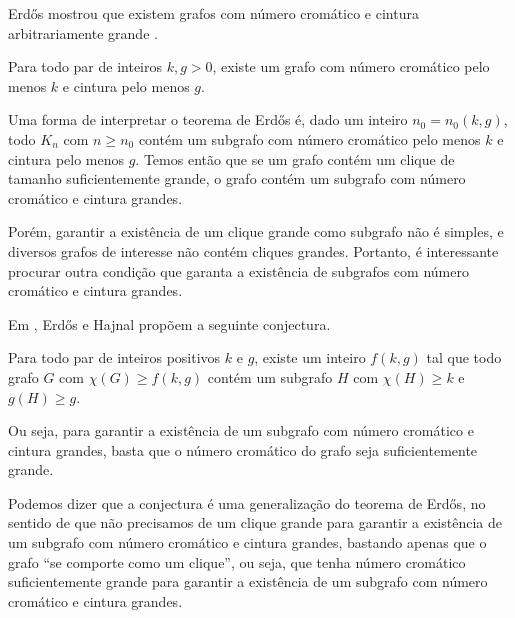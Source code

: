 
Erd\H{o}s mostrou que existem grafos com número cromático e cintura arbitrariamente grande \cite{erdos1959graph}.

\begin{teorema}\label{teoerdos}
Para todo par de inteiros $k,g > 0$, existe um grafo com número cromático pelo menos $k$ e cintura pelo menos $g$.
\end{teorema}

Uma forma de interpretar o teorema de Erd\H{o}s é, dado um inteiro $n_0 = n_0(k,g)$, todo $K_n$ com $n \geq n_0$ contém um subgrafo com número cromático pelo menos $k$ e cintura pelo menos $g$. Temos então que se um grafo contém um clique de tamanho suficientemente grande, o grafo contém um subgrafo com número cromático e cintura grandes.

Porém, garantir a existência de um clique grande como subgrafo não é simples, e diversos grafos de interesse não contém cliques grandes. Portanto, é interessante procurar outra condição que garanta a existência de subgrafos com número cromático e cintura grandes.

Em \cite{erdos1969conj}, Erd\H{o}s e Hajnal propõem a seguinte conjectura.

\begin{conjectura}
Para todo par de inteiros positivos $k$ e $g$, existe um inteiro $f(k,g)$ tal que todo grafo $G$ com $\chi(G) \geq f(k,g)$ contém um subgrafo $H$ com $\chi(H) \geq k$ e $g(H) \geq g$.
\end{conjectura}

Ou seja, para garantir a existência de um subgrafo com número cromático e cintura grandes, basta que o número cromático do grafo seja suficientemente grande.

Podemos dizer que a conjectura é uma generalização do teorema de Erd\H{o}s, no sentido de que não precisamos de um clique grande para garantir a existência de um subgrafo com número cromático e cintura grandes, bastando apenas que o grafo ``se comporte como um clique'', ou seja, que tenha número cromático suficientemente grande para garantir a existência de um subgrafo com número cromático e cintura grandes.

